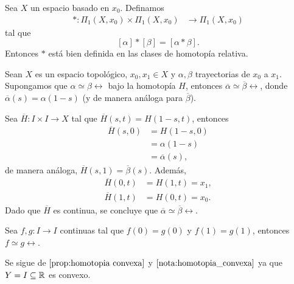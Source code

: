     \begin{coro}
        Sea $X$ un espacio basado en $x_0$. Definamos 
        \begin{align*}
            *:\Pi_1(X,x_0)\times \Pi_1(X,x_0)&\to \Pi_1(X,x_0)
        \end{align*}
    tal que 
    $$[\alpha]*[\beta]=[\alpha*\beta].$$
    Entonces $*$ está bien definida en las clases de homotopía relativa.
    \end{coro}
    \begin{lema}
        Sean $X$ es un espacio topológico, $x_0,x_1\in X$ y $\alpha,\beta$ trayectorias de $x_0$ a $x_1$. Supongamos que $\alpha\simeq\beta\rel$ bajo la homotopía $H$, entonces $\overline{\alpha}\simeq \overline{\beta}\rel$, donde $\overline{\alpha}(s)=\alpha(1-s)$ (y de manera análoga para $\overline{\beta}$).
    \end{lema}
    \begin{dem}
        Sea $\overline{H}:I\times I\to X$ tal que $\overline{H}(s,t)=H(1-s,t)$, entonces
        \begin{align*}
            \overline{H}(s,0)&=H(1-s,0)\\
            &=\alpha(1-s)\\
            &=\overline{\alpha}(s),
        \end{align*}
        de manera análoga, $\overline{H}(s,1)=\overline{\beta}(s)$. Además,
         \begin{align*}
            \overline{H}(0,t)&=H(1,t)=x_1,\\
            \overline{H}(1,t)&=H(0,t)=x_0.
        \end{align*}
        Dado que $\overline{H}$ es continua, se concluye que $\overline{\alpha}\simeq \overline{\beta}\rel$.
    \end{dem}
    \begin{lema}
    \label{lema:lema 2}
        Sea $f,g:I\to I$ continuas tal que $f(0)=g(0)$ y $f(1)=g(1)$, entonces $f\simeq g \rel$.
    \end{lema}
    \begin{dem}
        Se sigue de $\ref{prop:homotopia convexa}$ y $\ref{nota:homotopia_convexa}$ ya que $Y=I\subseteq \mathbb{R}$ es convexo.
    \end{dem}
    
